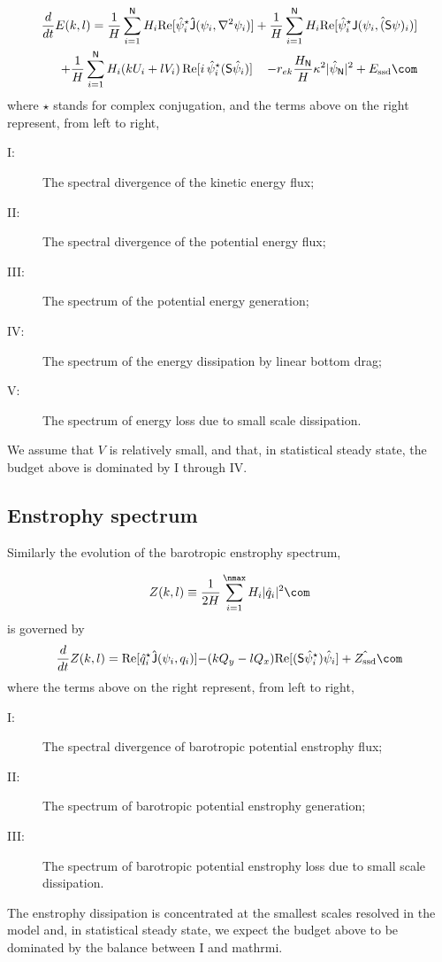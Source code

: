 \documentclass[11pt]{article}
\newcommand{\ssd}{\text{ssd}}
\newcommand{\sS}{\mathsf{S}}
\begin{document}
\begin{align}
    \frac{d}{dt} E(k,l) = {\frac{1}{H}\sum_{i=1}^{\mathsf{N}} H_i \text{Re}[\hat{\psi}_i^\star {\mathsf{\hat{J}}}(\psi_i,\nabla^2\psi_i)]} +
    {\frac{1}{H}\sum_{i=1}^{\mathsf{N}} H_i\text{Re}[\hat{\psi}_i^\star \hat{\mathsf{J} (\psi_i,(\sS \psi)_i)}]} \nonumber \\
    + {\frac{1}{H}\sum_{i=1}^{\mathsf{N}} H_i ( k U_i +  l V_i)\, \text{Re}[i \, \hat{\psi}^\star_i (\mathsf{S}\hat{\psi}_i)]} \,\,\,\,\,\,\,{- r_{ek} \frac{H_\mathsf{N}}{H} \kappa^2 |\hat{\psi}_{\mathsf{N}}|^2}  +{ {{E_\ssd}}} \com
\end{align}
where $\star$ stands for complex conjugation, and the terms above on the right represent, from
left to right,

\begin{description}
    \item[I:]  The spectral divergence of the kinetic energy flux;
    \item[II:] The spectral divergence of the potential energy flux; 
    \item[III:] The spectrum of the potential energy generation;
    \item[IV:] The spectrum of the energy dissipation by linear bottom drag;
    \item[V:] The spectrum of energy loss due to small scale dissipation.
\end{description}
We assume that $V$ is relatively small, and that, in statistical steady state, the
budget above is dominated by I through IV.

\subsection*{Enstrophy spectrum}
Similarly the evolution of the barotropic enstrophy spectrum,

\begin{equation}
Z(k,l) \equiv \frac{1}{2H} \sum_{i=1}^{\nmax} H_i |\hat{q}_i|^2\com
\end{equation}
is governed by
\begin{equation}
    \frac{d}{d t} Z(k,l) = {\text{Re}[\hat{q}_i^\star {\mathsf{\hat{J}}(\psi_i,q_i) ]}}
    {-(k Q_y - l Q_x)\text{Re}[(\sS \hat{\psi}_i^\star)\hat{\psi}_i]}
    + { {\hat{Z_\ssd}}}\com
\end{equation}
where the terms above on the right represent, from
left to right,
\begin{description}
    \item[I:]   The spectral divergence of barotropic potential enstrophy flux;
    \item[II:]  The spectrum of  barotropic potential enstrophy generation;
    \item[III:] The spectrum of  barotropic potential enstrophy loss due to small scale dissipation.
\end{description}
The enstrophy dissipation is concentrated at the smallest scales resolved in the model and, in statistical steady
state, we expect the budget above to be dominated by the balance between I and mathrm{i}.
\end{document}

